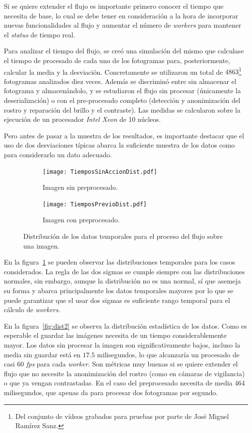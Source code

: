 Si se quiere extender el flujo es importante primero conocer el tiempo que necesita de base, lo cual se debe tener en consideración a la hora de incorporar nuevas funcionalidades al flujo y aumentar el número de \textit{workers} para mantener el \textit{status} de tiempo real.

Para analizar el tiempo del flujo, se creó una simulación del mismo que calculase el tiempo de procesado de cada uno de los fotogramas para, posteriormente, calcular la media y la desviación. Concretamente se utilizaron un total de $4863$\footnote{Del conjunto de vídeos grabados para pruebas por parte de José Miguel Ramírez Sanz.} fotogramas analizados diez veces. Además se discriminó entre sin almacenar el fotograma y almacenándolo, y se estudiaron el flujo sin procesar (únicamente la deserialización) o con el pre-procesado completo (detección y anonimización del rostro y reparación del brillo y el contraste). Las medidas se calcularon sobre la ejecución de un procesador \textit{Intel Xeon} de 10 núcleos.

Pero antes de pasar a la muestra de los resultados, es importante destacar que el uso de dos desviaciones típicas abarca la suficiente muestra de los datos como para considerarlo un dato adecuado. 

\begin{figure}
	\begin{subfigure}[b]{\textwidth}
		\texttt{[image: TiemposSinAccionDist.pdf]}
		\caption{Imagen sin preprocesado.}
	\end{subfigure}
	\begin{subfigure}[b]{\textwidth}
		\texttt{[image: TiemposPrevioDist.pdf]}
		\caption{Imagen con preprocesado.}
	\end{subfigure}
	\caption{Distribución de los datos temporales para el proceso del flujo sobre una imagen.}
	\label{fig:dist1}
\end{figure}


En la figura~\ref{fig:dist1} se pueden observar las distribuciones temporales para los casos considerados. La regla de las dos sigmas se cumple siempre con las distribuciones normales, sin embargo, aunque la distribución no es una normal, sí que asemeja su forma y abarca principalmente los datos temporales mayores por lo que se puede garantizar que el usar dos sigmas es suficiente rango temporal para el cálculo de \textit{workers}.

En la figura~\ref{fig:dist2} se observa la distribución estadística de los datos. Como es esperable el guardar las imágenes necesita de un tiempo considerablemente mayor. Los datos sin procesar la imagen son significativamente bajos, incluso la media sin guardar está en $17.5$ milisegundos, lo que alcanzaría un procesado de casi $60$ \textit{fps} para cada \textit{worker}. Son métricas muy buenas si se quiere extender el flujo que no necesite la anonimización del rostro (como en cámaras de vigilancia) o que ya vengan contrastadas. En el caso del preprocesado necesita de media $464$ milisegundos, que apenas da para procesar dos fotogramas por segundo.

